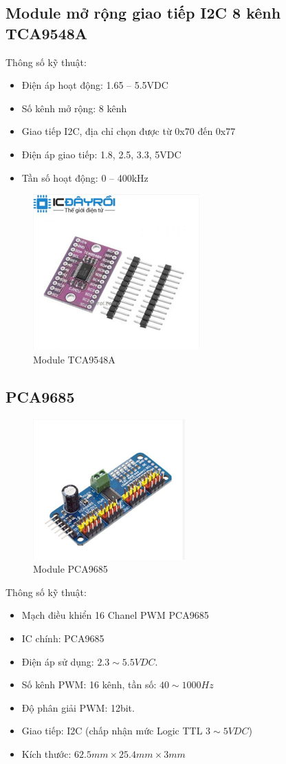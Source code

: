 \subsection{Module mở rộng giao tiếp I2C 8 kênh TCA9548A}
Thông số kỹ thuật:
\begin{itemize}
\item Điện áp hoạt động: 1.65 – 5.5VDC
\item Số kênh mở rộng: 8 kênh
\item Giao tiếp I2C, địa chỉ chọn được từ 0x70 đến 0x77
\item Điện áp giao tiếp: 1.8, 2.5, 3.3, 5VDC
\item Tần số hoạt động: 0 – 400kHz
\end{itemize}

\begin{figure}
\centering
\includegraphics[scale=1]{Chapters/Chapter4/Images/TCA}
\caption{Module TCA9548A}
\label{fig:tca}
\end{figure}


\subsection{PCA9685}
\begin{figure}[htp]
	\centering
	\includegraphics[scale=1]{Chapters/Chapter4/Images/PCA.png}
	\caption{Module PCA9685}
	\label{fig:C4PCA}
\end{figure}
Thông số kỹ thuật:
\begin{itemize}
\item Mạch điều khiển 16 Chanel PWM PCA9685
\item IC chính: PCA9685
\item Điện áp sử dụng: $2.3 \sim 5.5VDC$.
\item Số kênh PWM: 16 kênh, tần số: $40 \sim 1000Hz$
\item Độ phân giải PWM: 12bit.
\item Giao tiếp: I2C (chấp nhận mức Logic TTL $ 3 \sim 5VDC$)
\item Kích thước: $ 62.5mm \times 25.4mm \times 3mm $
\end{itemize}


